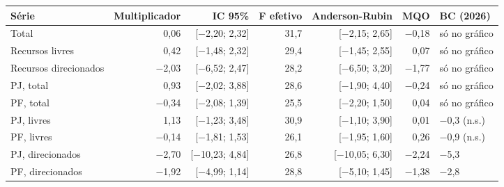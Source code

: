 \begin{tabular}{lrrrrrl}
\toprule
Série & Multiplicador & IC 95\% & F efetivo & Anderson-Rubin & MQO & BC (2026) \\
\midrule
Total & 0{,}06 & [\ensuremath{-}2{,}20; 2{,}32] & 31{,}7 & [\ensuremath{-}2{,}15; 2{,}65] & \ensuremath{-}0{,}18 & só no gráfico \\
Recursos livres & 0{,}42 & [\ensuremath{-}1{,}48; 2{,}32] & 29{,}4 & [\ensuremath{-}1{,}45; 2{,}55] & 0{,}07 & só no gráfico \\
Recursos direcionados & \ensuremath{-}2{,}03 & [\ensuremath{-}6{,}52; 2{,}47] & 28{,}2 & [\ensuremath{-}6{,}50; 3{,}20] & \ensuremath{-}1{,}77 & só no gráfico \\
PJ, total & 0{,}93 & [\ensuremath{-}2{,}02; 3{,}88] & 28{,}6 & [\ensuremath{-}1{,}90; 4{,}40] & \ensuremath{-}0{,}24 & só no gráfico \\
PF, total & \ensuremath{-}0{,}34 & [\ensuremath{-}2{,}08; 1{,}39] & 25{,}5 & [\ensuremath{-}2{,}20; 1{,}50] & 0{,}04 & só no gráfico \\
PJ, livres & 1{,}13 & [\ensuremath{-}1{,}23; 3{,}48] & 30{,}9 & [\ensuremath{-}1{,}10; 3{,}90] & 0{,}01 & \ensuremath{-}0{,}3 (n.s.) \\
PF, livres & \ensuremath{-}0{,}14 & [\ensuremath{-}1{,}81; 1{,}53] & 26{,}1 & [\ensuremath{-}1{,}95; 1{,}60] & 0{,}26 & \ensuremath{-}0{,}9 (n.s.) \\
PJ, direcionados & \ensuremath{-}2{,}70 & [\ensuremath{-}10{,}23; 4{,}84] & 26{,}8 & [\ensuremath{-}10{,}05; 6{,}30] & \ensuremath{-}2{,}24 & \ensuremath{-}5{,}3 \\
PF, direcionados & \ensuremath{-}1{,}92 & [\ensuremath{-}4{,}99; 1{,}14] & 28{,}8 & [\ensuremath{-}5{,}10; 1{,}45] & \ensuremath{-}1{,}38 & \ensuremath{-}2{,}8 \\
\bottomrule
\end{tabular}

